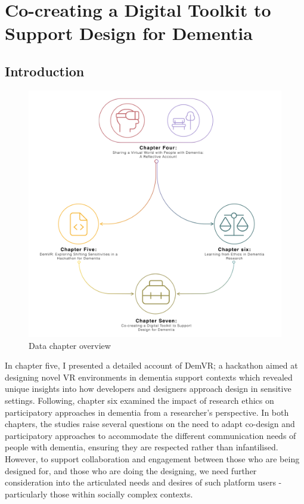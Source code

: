 \chapter{Co-creating a Digital Toolkit to Support Design for Dementia}
\label{D3}

\section{Introduction}
\label{D3:intro}
\begin{figure}[htp]
\centering
\includegraphics[width=0.6\linewidth]{Images/Thesis_Narrative/Narrative_Full.png}
\caption{Data chapter overview}
\label{fig:Thesis_Overview}
\end{figure}

In chapter five, I presented a detailed account of DemVR; a hackathon aimed at designing novel VR environments in dementia support contexts which revealed unique insights into how developers and designers approach design in sensitive settings. Following, chapter six examined the impact of research ethics on participatory approaches in dementia from a researcher's perspective. In both chapters, the studies raise several questions on the need to adapt co-design and participatory approaches to accommodate the different communication needs of people with dementia, ensuring they are respected rather than infantilised. However, to support collaboration and engagement between those who are being designed for, and those who are doing the designing, we need further consideration into the articulated needs and desires of such platform users - particularly those within socially complex contexts. 

